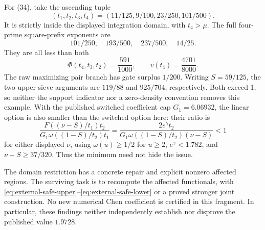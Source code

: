 For (34), take the ascending tuple
\[
 (t_1,t_2,t_3,t_4)=(11/125,9/100,23/250,101/500).
\]
It is strictly inside the displayed integration domain, with
$t_4>\mu$. The full four-prime square-prefix exponents are
\[
 101/250,\quad193/500,\quad237/500,\quad14/25.
\]
They are all less than both
\[
 \Phi(t_4,t_3,t_2)=\frac{591}{1000},\qquad
 v(t_4)=\frac{4701}{8000}.
\]
The raw maximizing pair branch has gate surplus $1/200$.
Writing $S=59/125$, the two upper-sieve arguments are
$119/88$ and $925/704$, respectively. Both exceed 1, so neither
the support indicator nor a zero-density convention removes
this example. With the published switched coefficient cap
$G_1=6.06932$, the linear option is also smaller than the
switched option here: their ratio is
\[
 \frac{F((\nu-S)/t_1)t_2}
 {G_1\omega((1-S)/t_2)t_1}
 =\frac{2e^\gamma t_2}{G_1\omega((1-S)/t_2)(\nu-S)}<1
\]
for either displayed $\nu$, using
$\omega(u)\ge1/2$ for $u\ge2$, $e^\gamma<1.782$, and
$\nu-S\ge37/320$. Thus the minimum need not hide the issue.

The domain restriction has a concrete repair and explicit
nonzero affected regions. The surviving task is to recompute
the affected functionals, with
\eqref{eq:external-safe-upper}--\eqref{eq:external-safe-lower}
or a proved stronger joint construction. No new numerical
Chen coefficient is certified in this fragment. In particular,
these findings neither independently establish nor disprove
the published value $1.9728$.

